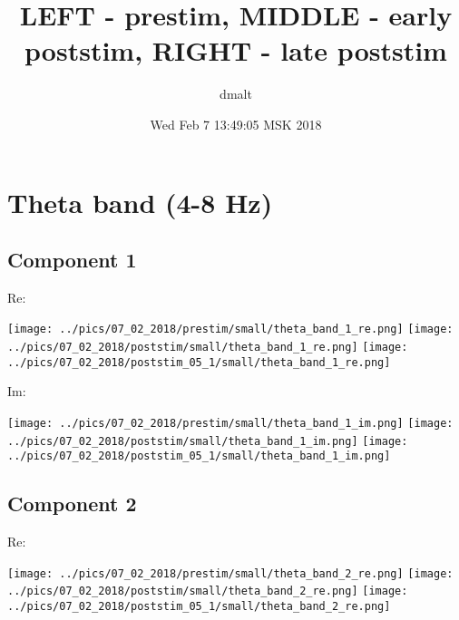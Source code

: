 \documentclass{article}
\title{LEFT - prestim, MIDDLE - early poststim, RIGHT - late poststim}
\author{dmalt}
\date{Wed Feb  7 13:49:05 MSK 2018}
\begin{document}
\maketitle
\newpage
\section{Theta band (4-8 Hz)}
\subsection*{Component 1}
Re:

\hspace{0.5cm}
\texttt{[image: ../pics/07\_02\_2018/prestim/small/theta\_band\_1\_re.png]}
\hspace{0.5cm}
\texttt{[image: ../pics/07\_02\_2018/poststim/small/theta\_band\_1\_re.png]}
\hspace{0.5cm}
\texttt{[image: ../pics/07\_02\_2018/poststim\_05\_1/small/theta\_band\_1\_re.png]}

Im:

\hspace{0.5cm}
\texttt{[image: ../pics/07\_02\_2018/prestim/small/theta\_band\_1\_im.png]}
\hspace{0.5cm}
\texttt{[image: ../pics/07\_02\_2018/poststim/small/theta\_band\_1\_im.png]}
\hspace{0.5cm}
\texttt{[image: ../pics/07\_02\_2018/poststim\_05\_1/small/theta\_band\_1\_im.png]}

\subsection*{Component 2}
Re:

\hspace{0.5cm}
\texttt{[image: ../pics/07\_02\_2018/prestim/small/theta\_band\_2\_re.png]}
\hspace{0.5cm}
\texttt{[image: ../pics/07\_02\_2018/poststim/small/theta\_band\_2\_re.png]}
\hspace{0.5cm}
\texttt{[image: ../pics/07\_02\_2018/poststim\_05\_1/small/theta\_band\_2\_re.png]}
\end{document}
